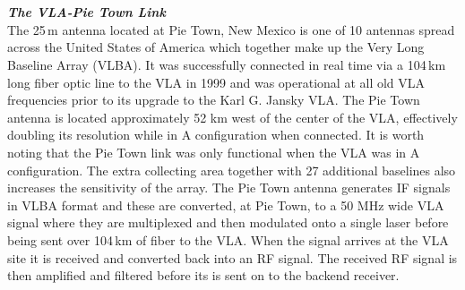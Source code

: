 \\
\\
\textit{\textbf{The VLA-Pie Town Link}}\\
The 25\,m antenna located at Pie Town, New Mexico is one of 10 antennas spread across the United States of America which together make up the Very Long Baseline Array (VLBA). It was successfully connected in real time via a 104\,km long fiber optic line to the VLA in 1999 and was operational at all old VLA frequencies prior to its upgrade to the Karl G. Jansky VLA. The Pie Town antenna is located approximately 52 km west of the center of the VLA, effectively doubling its resolution while in A configuration when connected. It is worth noting that the Pie Town link was only functional when the VLA was in A configuration. The extra collecting area together with 27 additional baselines also increases the sensitivity of the array. The Pie Town antenna generates IF signals in VLBA format and these are converted, at Pie Town, to a 50 MHz wide VLA signal where they are multiplexed and then modulated onto a single laser before being sent over 104\,km of fiber to the VLA. When the signal arrives at the VLA site it is received and converted back into an RF signal. The received RF signal is then amplified and filtered before its is sent on
to the backend receiver.